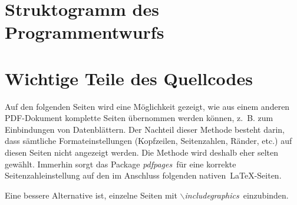 \section{Struktogramm des Programmentwurfs}

\section{Wichtige Teile des Quellcodes}

\setcounter{chapter}{5}
\setcounter{section}{0}
\setcounter{table}{0}
\setcounter{figure}{0}


Auf den folgenden Seiten wird eine Möglichkeit gezeigt, wie aus einem anderen PDF-Dokument komplette Seiten übernommen werden können, z.~B. zum Einbindungen von Datenblättern. Der Nachteil dieser Methode besteht darin, dass sämtliche Formateinstellungen (Kopfzeilen, Seitenzahlen, Ränder, etc.) auf diesen Seiten nicht angezeigt werden. Die Methode wird deshalb eher selten gewählt. Immerhin sorgt das Package \textit{\glqq pdfpages\grqq}~für eine korrekte Seitenzahleinstellung auf den im Anschluss folgenden \glqq nativen\grqq~\LaTeX-Seiten.

Eine bessere Alternative ist, einzelne Seiten mit \textit{\glqq$\backslash$includegraphics\grqq}~einzubinden.



\clearpage
